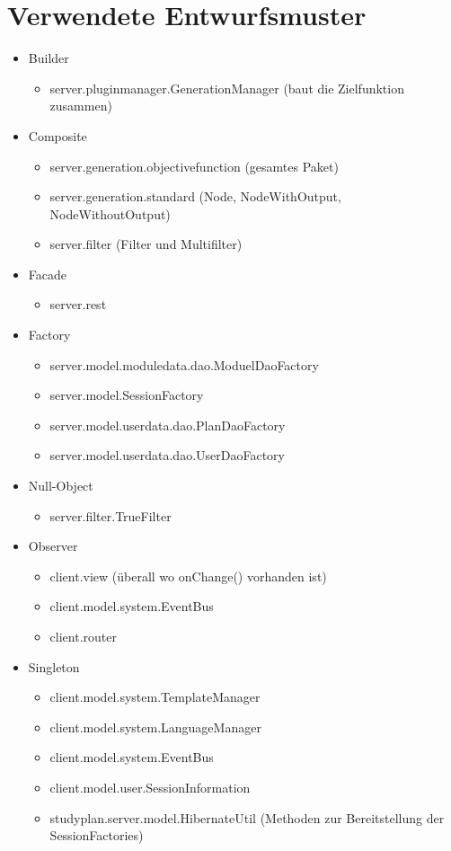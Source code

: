 \section{Verwendete Entwurfsmuster}
\begin{itemize}
	\item Builder
		\begin{itemize}
			\item server.pluginmanager.GenerationManager (baut die Zielfunktion zusammen)
		\end{itemize}
		
	\item Composite
		\begin{itemize}
			\item server.generation.objectivefunction (gesamtes Paket)
			\item server.generation.standard (Node, NodeWithOutput, NodeWithoutOutput)
			\item server.filter (Filter und Multifilter)
		\end{itemize}
		
	\item Facade
		\begin{itemize}
			\item server.rest
		\end{itemize}
	\item Factory
		\begin{itemize}
			\item server.model.moduledata.dao.ModuelDaoFactory
			\item server.model.SessionFactory
			\item server.model.userdata.dao.PlanDaoFactory
			\item server.model.userdata.dao.UserDaoFactory
		\end{itemize}	
	\item Null-Object
		\begin{itemize}
			\item server.filter.TrueFilter
		\end{itemize}
		
	\item Observer
		\begin{itemize}
			\item client.view (überall wo onChange() vorhanden ist)
			\item client.model.system.EventBus
			\item client.router
		\end{itemize}
	
	\item Singleton
		\begin{itemize}
			\item client.model.system.TemplateManager
			\item client.model.system.LanguageManager
			\item client.model.system.EventBus
			\item client.model.user.SessionInformation
			\item studyplan.server.model.HibernateUtil (Methoden zur Bereitstellung der SessionFactories)
		\end{itemize}
	

\end{itemize}
